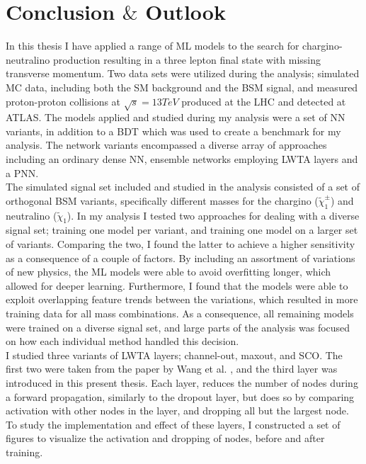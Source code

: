 \newpage
\chapter*{Conclusion $\&$ Outlook}
In this thesis I have applied a range of \ac{ML} models to the search for chargino-neutralino production resulting in 
a three lepton final state with missing transverse momentum. Two data sets were utilized during the analysis; simulated \ac{MC} data, including 
both the \ac{SM} background and the \ac{BSM} signal, and  measured proton-proton collisions at $\sqrt{s} = 13TeV$ produced at the \ac{LHC} and detected 
at \ac{ATLAS}. The models applied and studied during my analysis were a set of \ac{NN} variants, in addition to a \ac{BDT} which was used to 
create a benchmark for my analysis. The network variants encompassed a diverse array of approaches including an ordinary dense \ac{NN}, ensemble networks 
employing \ac{LWTA} layers and a \ac{PNN}.
\\\newline
The simulated signal set included and studied in the analysis consisted of a set of orthogonal \ac{BSM} variants, specifically different masses for the chargino ($\tilde{\chi}^\pm_1$) 
and neutralino ($\tilde{\chi}_1$). In my analysis I tested two approaches for dealing with a diverse signal set; training one model per variant, and training one model on a larger set 
of variants. Comparing the two, I found the latter to achieve a higher sensitivity as a consequence of a couple of factors. By including an assortment of variations of new physics, 
the \ac{ML} models were able to avoid overfitting longer, which allowed for deeper learning. Furthermore, I found that the models were able to exploit overlapping feature trends between 
the variations, which resulted in more training data for all mass combinations. As a consequence, all remaining models were trained on a diverse signal set, and large parts of the analysis 
was focused on how each individual method handled this decision.
\\\newline
I studied three variants of \ac{LWTA} layers; channel-out, maxout, and \ac{SCO}. The first two were taken from the paper by Wang et al. \cite{wang_maxout_2013}, and the third layer was introduced
in this present thesis. Each layer, reduces the number of nodes during a forward propagation, similarly to the dropout layer, but does so by comparing activation with other nodes in the layer, and 
dropping all but the largest node. To study the implementation and effect of these layers, I constructed a set of figures to visualize the activation and dropping of nodes, before and after training. 

